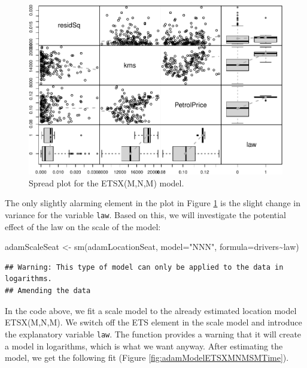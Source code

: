 \documentclass[
]{book}
\newenvironment{Shaded}{\begin{snugshade}}{\end{snugshade}}
\newcommand{\AttributeTok}[1]{\textcolor[rgb]{0.77,0.63,0.00}{#1}}
\newcommand{\FunctionTok}[1]{\textcolor[rgb]{0.00,0.00,0.00}{#1}}
\newcommand{\NormalTok}[1]{#1}
\newcommand{\OtherTok}[1]{\textcolor[rgb]{0.56,0.35,0.01}{#1}}
\newcommand{\SpecialCharTok}[1]{\textcolor[rgb]{0.00,0.00,0.00}{#1}}
\newcommand{\StringTok}[1]{\textcolor[rgb]{0.31,0.60,0.02}{#1}}
\theoremstyle{definition}
\theoremstyle{definition}
\theoremstyle{definition}
\theoremstyle{definition}
\theoremstyle{remark}
\begin{document}
\begin{figure}
\centering
\includegraphics{Svetunkov--2022----ADAM_files/figure-latex/adamModelETSXMNMDiagnosticsXreg-1.pdf}
\caption{\label{fig:adamModelETSXMNMDiagnosticsXreg}Spread plot for the ETSX(M,N,M) model.}
\end{figure}

The only slightly alarming element in the plot in Figure \ref{fig:adamModelETSXMNMDiagnosticsXreg} is the slight change in variance for the variable \texttt{law}. Based on this, we will investigate the potential effect of the law on the scale of the model:

\begin{Shaded}
\begin{Highlighting}[]
\NormalTok{adamScaleSeat }\OtherTok{\textless{}{-}} \FunctionTok{sm}\NormalTok{(adamLocationSeat, }\AttributeTok{model=}\StringTok{"NNN"}\NormalTok{, }\AttributeTok{formula=}\NormalTok{drivers}\SpecialCharTok{\textasciitilde{}}\NormalTok{law)}
\end{Highlighting}
\end{Shaded}

\begin{verbatim}
## Warning: This type of model can only be applied to the data in logarithms.
## Amending the data
\end{verbatim}

In the code above, we fit a scale model to the already estimated location model ETSX(M,N,M). We switch off the ETS element in the scale model and introduce the explanatory variable \texttt{law}. The function provides a warning that it will create a model in logarithms, which is what we want anyway. After estimating the model, we get the following fit (Figure \ref{fig:adamModelETSXMNMSMTime}).
\end{document}
